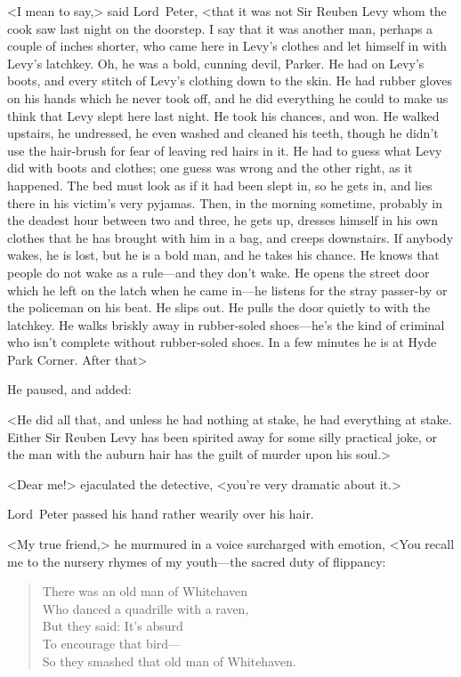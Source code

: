 <I mean to say,> said Lord~Peter, <that it was not Sir Reuben Levy whom the cook saw last night on the doorstep. I say that it was another man, perhaps a couple of inches shorter, who came here in Levy's clothes and let himself in with Levy's latchkey. Oh, he was a bold, cunning devil, Parker. He had on Levy's boots, and every stitch of Levy's clothing down to the skin. He had rubber gloves on his hands which he never took off, and he did everything he could to make us think that Levy slept here last night. He took his chances, and won. He walked upstairs, he undressed, he even washed and cleaned his teeth, though he didn't use the hair-brush for fear of leaving red hairs in it. He had to guess what Levy did with boots and clothes; one guess was wrong and the other right, as it happened. The bed must look as if it had been slept in, so he gets in, and lies there in his victim's very pyjamas. Then, in the morning sometime, probably in the deadest hour between two and three, he gets up, dresses himself in his own clothes that he has brought with him in a bag, and creeps downstairs. If anybody wakes, he is lost, but he is a bold man, and he takes his chance. He knows that people do not wake as a rule—and they don't wake. He opens the street door which he left on the latch when he came in—he listens for the stray passer-by or the policeman on his beat. He slips out. He pulls the door quietly to with the latchkey. He walks briskly away in rubber-soled shoes—he's the kind of criminal who isn't complete without rubber-soled shoes. In a few minutes he is at Hyde Park Corner. After that\longdash>

He paused, and added:

<He did all that, and unless he had nothing at stake, he had everything at stake. Either Sir Reuben Levy has been spirited away for some silly practical joke, or the man with the auburn hair has the guilt of murder upon his soul.>

<Dear me!> ejaculated the detective, <you're very dramatic about it.>

Lord~Peter passed his hand rather wearily over his hair.

<My true friend,> he murmured in a voice surcharged with emotion, <You recall me to the nursery rhymes of my youth—the sacred duty of flippancy:

\begin{a4}
	\enlargethispage{\baselineskip}
\end{a4}

\begin{samepage}
\begin{verse}
There was an old man of Whitehaven\\
Who danced a quadrille with a raven,\\
\vin But they said: It's absurd\\
\vin To encourage that bird—\\
So they smashed that old man of Whitehaven.\\
\end{verse}
\end{samepage}

